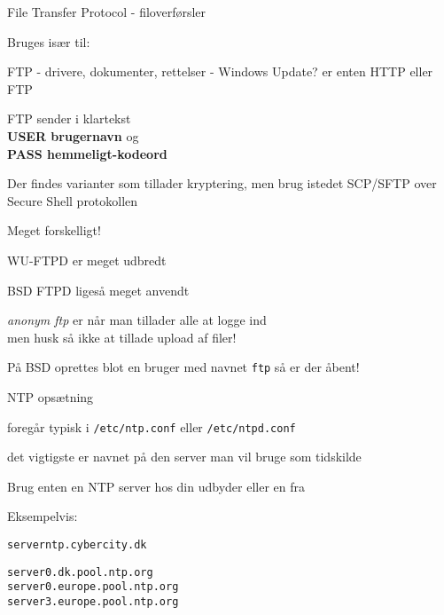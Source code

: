 
\begin{list1}
\item File Transfer Protocol - filoverførsler
\item Bruges især til:
  \begin{list2}
    \item FTP - drivere, dokumenter, rettelser - Windows Update? er
    enten HTTP eller FTP
  \end{list2}
\item FTP sender i klartekst\\ 
{\bfseries USER brugernavn} og \\
{\bfseries PASS hemmeligt-kodeord} 
\item Der findes varianter som tillader kryptering, men brug istedet SCP/SFTP over Secure Shell protokollen
\end{list1}



\begin{list1}
\item Meget forskelligt!
\item WU-FTPD er meget udbredt
\item BSD FTPD ligeså meget anvendt
\item \emph{anonym ftp} er når man tillader alle at logge ind\\
men husk så ikke at tillade upload af filer!
\item På BSD oprettes blot en bruger med navnet \verb+ftp+ så er der åbent!
\end{list1}



\begin{list1}
\item NTP opsætning
\item foregår typisk i \verb+/etc/ntp.conf+ eller \verb+/etc/ntpd.conf+   
\item det vigtigste er navnet på den server man vil bruge som tidskilde
\item Brug enten en NTP server hos din udbyder eller en fra 
\item Eksempelvis:
\end{list1}

\begin{alltt}
server ntp.cybercity.dk

server 0.dk.pool.ntp.org
server 0.europe.pool.ntp.org
server 3.europe.pool.ntp.org

\end{alltt}

